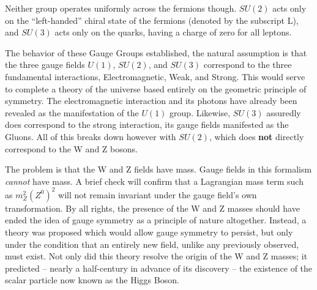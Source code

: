     Neither group operates uniformly across the fermions though.
    $SU(2)$ acts only on the ``left-handed'' chiral state of the fermions (denoted by the subscript L),
        and $SU(3)$ acts only on the quarks, having a charge of zero for all leptons.

    The behavior of these Gauge Groups established, the natural assumption is that the three gauge fields
        $U(1)$, $SU(2)$, and $SU(3)$ correspond to the three fundamental interactions,
        Electromagnetic, Weak, and Strong.
    This would serve to complete a theory of the universe based entirely on the geometric principle of symmetry.
    The electromagnetic interaction and its photons have already been revealed as the manifestation of the $U(1)$ group. 
    Likewise, $SU(3)$ assuredly does correspond to the strong interaction, its gauge fields manifested as the Gluons.
    All of this breaks down however with $SU(2)$, which does \textbf{not} directly correspond to the W and Z bosons.

    The problem is that the W and Z fields have mass.
    Gauge fields in this formalism \textit{cannot} have mass.
    A brief check will confirm that a Lagrangian mass term such as $m_Z^2 (Z^0)^2$
        will not remain invariant under the gauge field's own transformation.
    By all rights, the presence of the W and Z masses should have
        ended the idea of gauge symmetry as a principle of nature altogether.
    Instead, a theory was proposed which would allow gauge symmetry to persist,
        but only under the condition that an entirely new field, unlike any previously observed, must exist.
    Not only did this theory resolve the origin of the W and Z masses;
        it predicted -- nearly a half-century in advance of its discovery --
        the existence of the scalar particle now known as the Higgs Boson.
    \cite{Osborn_notes}
    \cite{Peskin_book}
    \cite{Halzen_book}

